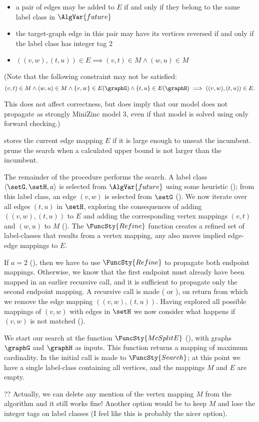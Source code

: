 \begin{itemize}
    \item a pair of edges may be added to $E$ if and only if they belong to the same label class in $\AlgVar{future}$
    \item the target-graph edge in this pair may have its vertices reversed if and only if the label class has integer tag 2
    \item $((v,w),(t,u)) \in E \implies (v,t) \in M \wedge (w,u) \in M$ 
\end{itemize}

(Note that the following constraint may not be satisfied:
\[
(v,t) \in M \wedge (w,u) \in M \wedge \{v,w\} \in E(\graphG) \wedge \{t,u\} \in E(\graphH) \implies ((v,w),(t,u)) \in E.
\]

This does not affect correctness, but does imply that our model does not propagate as strongly MiniZinc model 3,
even if that model is solved using only forward checking.)

 stores the current edge mapping $E$ if it is large enough
to unseat the incumbent.   prune the
search when a calculated upper bound is not larger than the incumbent.

The remainder of the procedure performs the search.  A label class $\langle
\setG, \setH, a \rangle$ is selected from $\AlgVar{future}$ using some
heuristic (); from this label class, an edge $(v,w)$ is
selected from $\setG$ (). We now iterate over all edges
$(t,u)$ in $\setH$, exploring the consequences of adding $((v,w),(t,u))$ to $E$
and adding the corresponding vertex mappings $(v,t)$ and $(w,u)$ to $M$
().  The $\FuncSty{Refine}$ function
creates a refined set of label-classes that results from a vertex mapping,
any also moves implied edge-edge mappings to $E$.

If $a=2$ (), then we have to use $\FuncSty{Refine}$ to propagate
both endpoint mappings.  Otherwise, we know that the first endpoint must already have
been mapped in an earlier recursive call, and it is sufficient to propagate only the second
endpoint mapping.  
A recursive call is made ( or ),
on return from which we remove the edge mapping $((v,w),(t,u))$.
Having explored all possible mappings of $(v,w)$ with edges in $\setH$ we now
consider what happens if $(v,w)$ is not matched
().

We start our search at the function $\FuncSty{McSplitE}$ (),
with graphs $\graphG$ and $\graphH$ as inputs.  This function returns a mapping of
maximum cardinality.  In  the initial call is made to
$\FuncSty{Search}$; at this point we have a single label-class containing all
vertices, and the mappings $M$ and $E$ are empty.

?? Actually, we can delete any mention of the vertex mapping $M$ from the algorithm and it still works fine!
Another option would be to keep $M$ and lose the integer tags on label classes (I feel like this is probably the
nicer option).
